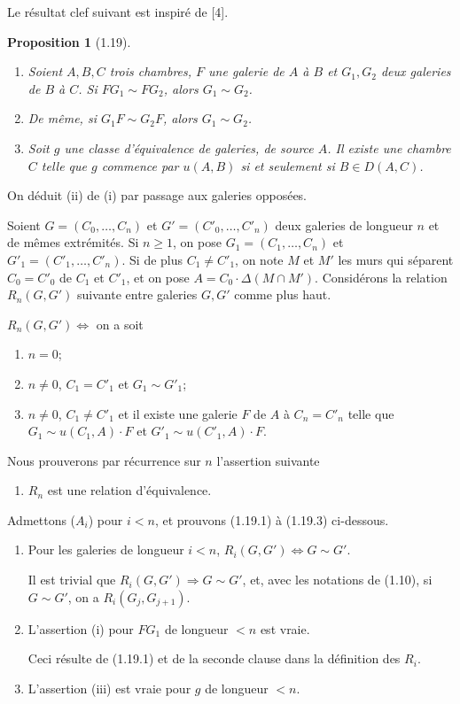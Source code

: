 \documentclass[12pt]{article}
\newtheorem{proposition}[theoreme]{Proposition}
\theoremstyle{remark}
\begin{document}
Le résultat clef suivant est inspiré de [4].

\begin{proposition}[1.19]
\begin{enumerate}
\item[(i)] Soient $A, B, C$ trois chambres, $F$ une galerie de $A$ à $B$ et $G_1, G_2$ deux galeries de $B$ à $C$. Si $F G_1 \sim F G_2$, alors $G_1 \sim G_2$.
\item[(ii)] De même, si $G_1 F \sim G_2 F$, alors $G_1 \sim G_2$.
\item[(iii)] Soit $g$ une classe d'équivalence de galeries, de source $A$. Il existe une chambre $C$ telle que $g$ commence par $u(A, B)$ si et seulement si $B \in D(A, C)$.
\end{enumerate}
\end{proposition}

On déduit (ii) de (i) par passage aux galeries opposées.

Soient $G = (C_0, \ldots, C_n)$ et $G' = (C'_0, \ldots, C'_n)$ deux galeries de longueur $n$ et de mêmes extrémités. Si $n \geq 1$, on pose $G_1 = (C_1, \ldots, C_n)$ et $G'_1 = (C'_1, \ldots, C'_n)$. Si de plus $C_1 \neq C'_1$, on note $M$ et $M'$ les murs qui séparent $C_0 = C'_0$ de $C_1$ et $C'_1$, et on pose $A = C_0 \cdot \Delta(M \cap M')$. Considérons la relation $R_n(G, G')$ suivante entre galeries $G, G'$ comme plus haut.

$R_n(G, G') \Leftrightarrow$ on a soit
\begin{enumerate}
\item[$\alpha$)] $n = 0$;
\item[$\beta$)] $n \neq 0$, $C_1 = C'_1$ et $G_1 \sim G'_1$;
\item[$\gamma$)] $n \neq 0$, $C_1 \neq C'_1$ et il existe une galerie $F$ de $A$ à $C_n = C'_n$ telle que $G_1 \sim u(C_1, A) \cdot F$ et $G'_1 \sim u(C'_1, A) \cdot F$.
\end{enumerate}

Nous prouverons par récurrence sur $n$ l'assertion suivante
\begin{enumerate}
\item[($A_n$)] $R_n$ est une relation d'équivalence.
\end{enumerate}

Admettons ($A_i$) pour $i < n$, et prouvons (1.19.1) à (1.19.3) ci-dessous.

\begin{enumerate}
\item[(1.19.1)] Pour les galeries de longueur $i < n$, $R_i(G, G') \Leftrightarrow G \sim G'$.

Il est trivial que $R_i(G, G') \Rightarrow G \sim G'$, et, avec les notations de (1.10), si $G \sim G'$, on a $R_i(G_j, G_{j+1})$.

\item[(1.19.2)] L'assertion (i) pour $F G_1$ de longueur $< n$ est vraie.

Ceci résulte de (1.19.1) et de la seconde clause dans la définition des $R_i$.

\item[(1.19.3)] L'assertion (iii) est vraie pour $g$ de longueur $< n$.
\end{enumerate}
\end{document}
